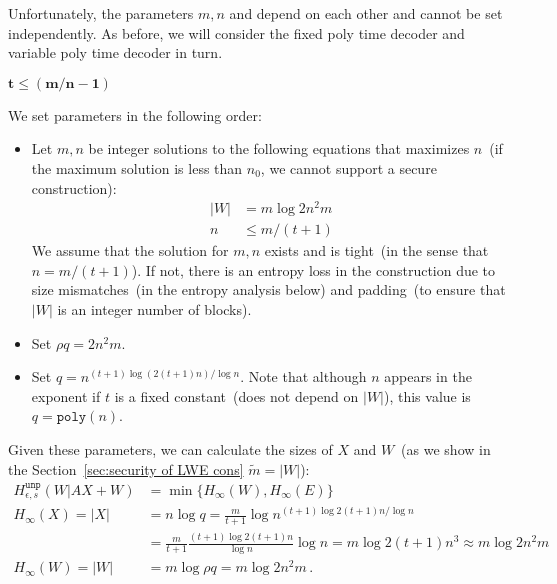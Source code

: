 \documentclass[11pt]{article}
\newcommand{\secref}[1]{\mbox{Section~\ref{#1}}}
\newcommand{\unp}{\ensuremath{\mathtt{unp}}\xspace}
\newcommand{\poly}{\ensuremath{\mathtt{poly}}\xspace}
\begin{document}
{Unfortunately, the parameters $m, n$ and depend on each other and cannot be set independently.  As before, we will consider the fixed poly time decoder and variable poly time decoder in turn.

$\mathbf{t\leq (m/n-1)}$

We set parameters in the following order:
\begin{itemize}
\item Let $m, n$ be integer solutions to the following equations that maximizes $n$~(if the maximum solution is less than $n_0$, we cannot support a secure construction):
\begin{align*}
|W| &= m\log 2n^2m\\
n&\leq m/(t+1)
\end{align*}
We assume that the solution for $m,n$ exists and is tight~(in the sense that $n = m/(t+1)$).  If not, there is an entropy loss in the construction due to size mismatches~(in the entropy analysis below) and padding~(to ensure that $|W|$ is an integer number of blocks).
\item Set $\rho q = 2n^2m $.
\item Set $q = n^{(t+1)\log( 2(t+1)n)/\log n}$.  Note that although $n$ appears in the exponent if $t$ is a fixed constant~(does not depend on $|W|$), this value is $q =\poly(n)$.  
\end{itemize}  Given these parameters, we can calculate the sizes of $X$ and $W$~(as we show in the \secref{sec:security of LWE cons} $\tilde{m} =|W|$):
\begin{align*}
H^{\unp}_{\epsilon, s} ( W | AX+W) &= \min\{ H_\infty(W), H_\infty(E)\}\\
H_\infty(X) = |X| &= n \log q= \frac{m}{t+1}\log n^{(t+1)\log 2(t+1)n/\log n} \\
&= \frac{m}{t+1} \frac{(t+1)\log 2(t+1)n}{\log n} \log n = m \log 2(t+1)n^3 \approx m\log 2n^2m\\
H_\infty(W) = |W| & = m \log \rho q = m \log 2n^2 m\,.
\end{align*}

}
\end{document}
